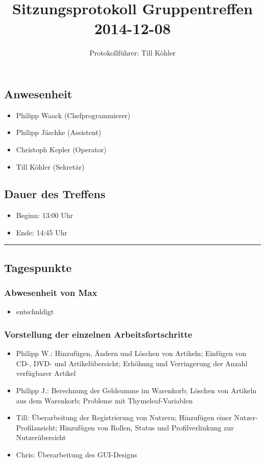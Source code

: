\documentclass[12pt,a4paper]{article}
\author{Protokollführer: Till Köhler}
\title{Sitzungsprotokoll Gruppentreffen 2014-12-08}
\date{}
\begin{document}
\maketitle

\subsection*{Anwesenheit}
\medskip
\begin{itemize}
\item Philipp Waack (Chefprogrammierer)
\item Philipp Jäschke (Assistent)
\item Christoph Kepler (Operator)
\item Till Köhler (Sekretär)
\end{itemize}

\subsection*{Dauer des Treffens}
\medskip
\begin{itemize}
\item Beginn: 13:00 Uhr
\item Ende: 14:45 Uhr
\end{itemize}

\noindent\rule{\textwidth}{1pt}

\subsection*{Tagespunkte}
\medskip

\subsubsection*{Abwesenheit von Max}
\begin{itemize}
\item entschuldigt
\end{itemize}

\subsubsection*{Vorstellung der einzelnen Arbeitsfortschritte}
\begin{itemize}
\item Philipp W.: Hinzufügen, Ändern und Löschen von Artikeln; Einfügen von CD-, DVD- und Artikelübersicht; Erhöhung und Verringerung der Anzahl verfügbarer Artikel
\item Philipp J.: Berechnung der Geldsumme im Warenkorb; Löschen von Artikeln aus dem Warenkorb; Probleme mit Thymeleaf-Variablen
\item Till: Überarbeitung der Registrierung von Nutzern; Hinzufügen einer Nutzer-Profilansicht; Hinzufügen von Rollen, Status und Profilverlinkung zur Nutzerübersicht
\item Chris: Überarbeitung des GUI-Designs
\end{itemize}
\end{document}
